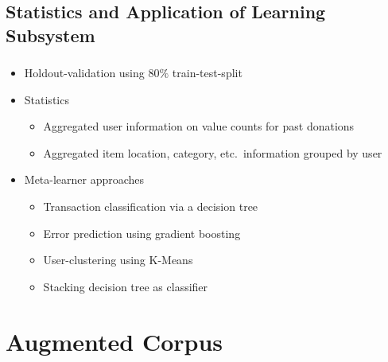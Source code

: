 \documentclass[aspectratio=169]{beamer}
\begin{document}
\subsection{Statistics and Application of Learning Subsystem}
\begin{frame}
	\frametitle{\insertsection}
	\framesubtitle{\insertsubsection}

	\begin{itemize}
		\item Holdout-validation using $80\%$ train-test-split
		\item Statistics
		\begin{itemize}
			\item Aggregated user information on value counts for past donations
			\item Aggregated item location, category, etc.~information grouped by user
		\end{itemize}
		\item Meta-learner approaches
		\begin{itemize}
			\item Transaction classification via a decision tree
			\item Error prediction using gradient boosting
			\item User-clustering using K-Means
			\item Stacking decision tree as classifier
		\end{itemize}
	\end{itemize}

\end{frame}

\section[Results]{Augmented Corpus}
\frame{\vfill\centering\tableofcontents[sectionstyle=show/shaded,subsectionstyle=show/hide]\vfill}
\end{document}
